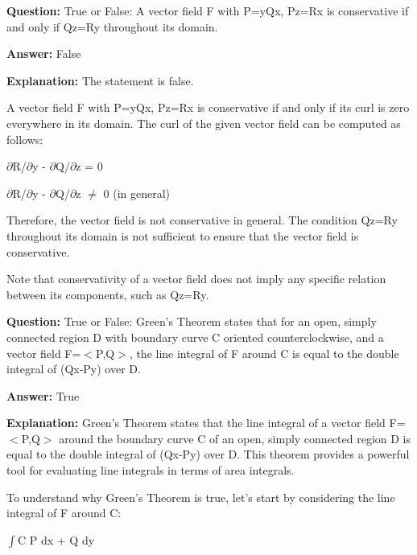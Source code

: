 \documentclass{article}
\begin{document}
                \vspace{0.5cm} 
        
            
                \textbf {Question:} True or False: A vector field F with P=yQx, Pz=Rx is conservative if and only if Qz=Ry throughout its domain.
                
                \textbf{Answer:} False

                \textbf{Explanation:} The statement is false.

A vector field F with P=yQx, Pz=Rx is conservative if and only if its curl is zero everywhere in its domain. The curl of the given vector field can be computed as follows:

\ensuremath{\partial}R/\ensuremath{\partial}y - \ensuremath{\partial}Q/\ensuremath{\partial}z = 0

\ensuremath{\partial}R/\ensuremath{\partial}y - \ensuremath{\partial}Q/\ensuremath{\partial}z \ensuremath{\neq} 0 (in general)

Therefore, the vector field is not conservative in general. The condition Qz=Ry throughout its domain is not sufficient to ensure that the vector field is conservative.

Note that conservativity of a vector field does not imply any specific relation between its components, such as Qz=Ry.
                
                \vspace{0.5cm} 
        
            
                \textbf {Question:} True or False: Green's Theorem states that for an open, simply connected region D with boundary curve C oriented counterclockwise, and a vector field F=\ensuremath{<}P,Q\ensuremath{>}, the line integral of F around C is equal to the double integral of (Qx-Py) over D.
                
                \textbf{Answer:} True

                \textbf{Explanation:} Green's Theorem states that the line integral of a vector field F=\ensuremath{<}P,Q\ensuremath{>} around the boundary curve C of an open, simply connected region D is equal to the double integral of (Qx-Py) over D. This theorem provides a powerful tool for evaluating line integrals in terms of area integrals.

To understand why Green's Theorem is true, let's start by considering the line integral of F around C:

\ensuremath{\int}C P dx + Q dy
\end{document}
